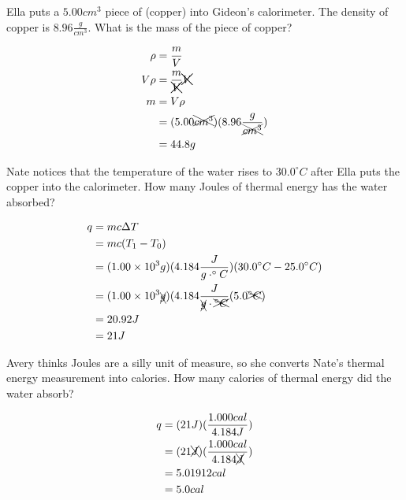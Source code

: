 \documentclass[11pt,addpoints]{exam}   	%
\begin{document}
\begin{questions}
\question[5] Ella puts a $5.00 cm^3$ piece of  (copper) into Gideon's calorimeter.  The density of copper is $8.96 \frac{g}{cm^{3}}$. What is the mass of the piece of copper?
\begin{solution}
\begin{equation} 
\begin{split}
   \rho &= \frac{m}{V} \\
   V \rho &= \frac{m}{\xcancel{V}} \xcancel{V} \\
   m &= V \rho \\     
       &= (5.00 \xcancel{cm^3})(8.96 \frac{g}{\xcancel{cm^3}}) \\
       &= 44.8 g                             
 \end{split}
 \end{equation}
 \end{solution}

\question[5] Nate notices that the temperature of the water rises to $30.0^{\circ}C$ after Ella puts the copper into the calorimeter. How many Joules of thermal energy has the water absorbed?
\begin{solution}
\begin{equation} 
\begin{split}
   q &= m c \Delta T \\
      &= m c (T_1 - T_0) \\
      &= (1.00 \times 10^3 g) (4.184 \frac{J}{g \cdot ^{\circ}C})(30.0 ^{\circ} C - 25.0 ^{\circ} C) \\
      &= (1.00 \times 10^3 \xcancel{g})(4.184 \frac{J}{\xcancel{g} \cdot \xcancel{^{\circ}C}} (5.0 \xcancel{^{\circ} C}) \\
      &= 20.92 J \\
      &= 21 J                           
 \end{split}
 \end{equation}
 \end{solution}

\question[5] Avery thinks Joules are a silly unit of measure, so she converts Nate's thermal energy measurement into calories. How many calories of thermal energy did the water absorb?
\begin{solution}
\begin{equation} 
\begin{split}
   q &= (21 J) (\frac{1.000 cal}{4.184 J}) \\
      &= (21 \xcancel{J})(\frac{1.000 cal}{4.184 \xcancel{J}}) \\
      &= 5.01912 cal \\
      &= 5.0 cal                        
 \end{split}
 \end{equation}
 \end{solution}


\end{questions}
\end{document}
